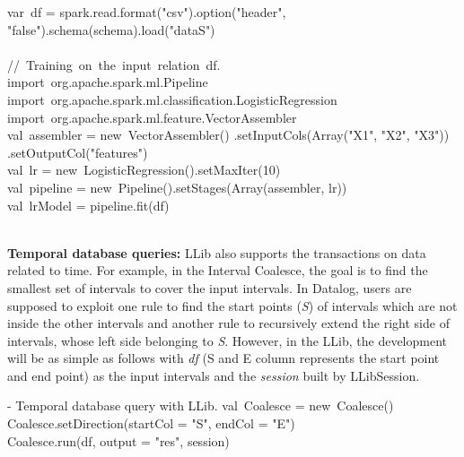 var\ df = spark.read.format("csv").option("header", "false").schema(schema).load("dataS") \\
\\
//\ Training\ on\ the\ input\ relation\ df. \\
import\ org.apache.spark.ml.Pipeline \\
import\ org.apache.spark.ml.classification.LogisticRegression \\
import\ org.apache.spark.ml.feature.VectorAssembler
\\
val\ assembler = new\ VectorAssembler()
.setInputCols(Array("X1", "X2", "X3"))\\
.setOutputCol("features") \\
val\ lr = new\  LogisticRegression().setMaxIter(10) \\
val\ pipeline = new\ Pipeline().setStages(Array(assembler, lr)) \\
val\ lrModel = pipeline.fit(df) \\
\\

\eldl



\textbf{Temporal database queries:}
LLib also supports the transactions on data related to time. For example, in the Interval Coalesce, the goal is to find the smallest set of intervals to cover the input intervals. In Datalog, users are supposed to exploit one rule to find the start points (\textit{S}) of intervals which are not inside the other intervals and another rule to recursively extend the right side of intervals, whose left side belonging to \textit{S}. However, in the LLib, the development will be as simple as follows with \textit{df} (S and E column represents the start point and end point) as the input intervals and the \textit{session} built by LLibSession.


\vspace{0.5em}
 - Temporal database query with LLib.
\bldl
val\ Coalesce = new\ Coalesce() \\
Coalesce.setDirection(startCol = "S", endCol = "E") \\
Coalesce.run(df, output = "res", session)
\eldl

